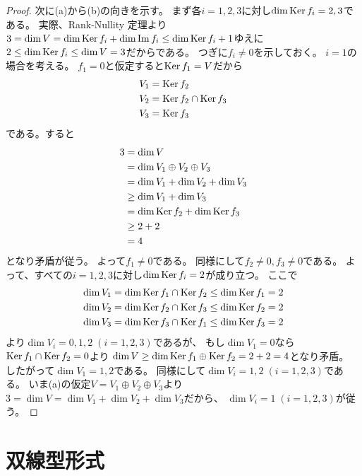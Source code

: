 \documentclass[report]{jlreq}
\begin{document}
\begin{proof}
    次に(a)から(b)の向きを示す。
    まず各$i = 1, 2, 3$に対し$\dim \operatorname{\mathrm{Ker}} f_i = 2, 3$である。
    実際、Rank-Nullity 定理より
    $3 = \dim V = \dim \operatorname{\mathrm{Ker}} f_i + \dim \operatorname{\mathrm{Im}} f_i \le \dim \operatorname{\mathrm{Ker}} f_i + 1$ゆえに
    $2 \le \dim \operatorname{\mathrm{Ker}} f_i \le \dim V = 3$だからである。
    つぎに$f_i \neq 0$を示しておく。
    $i = 1$の場合を考える。
    $f_1 = 0$と仮定すると$\operatorname{\mathrm{Ker}} f_1 = V$だから
    \begin{alignat}{1}
        V_1 &= \operatorname{\mathrm{Ker}} f_2 \\
        V_2 &= \operatorname{\mathrm{Ker}} f_2 \cap \operatorname{\mathrm{Ker}} f_3 \\
        V_3 &= \operatorname{\mathrm{Ker}} f_3
    \end{alignat}
    である。すると
    \begin{alignat}{1}
        3
            &= \dim V \\
            &= \dim V_1 \oplus V_2 \oplus V_3 \\
            &= \dim V_1 + \dim V_2 + \dim V_3 \\
            &\ge \dim V_1 + \dim V_3 \\
            &= \dim \operatorname{\mathrm{Ker}} f_2 + \dim \operatorname{\mathrm{Ker}} f_3 \\
            &\ge 2 + 2 \\
            &= 4
    \end{alignat}
    となり矛盾が従う。
    よって$f_1 \neq 0$である。
    同様にして$f_2 \neq 0, f_3 \neq 0$である。
    よって、すべての$i = 1, 2, 3$に対し$\dim \operatorname{\mathrm{Ker}} f_i = 2$が成り立つ。
    ここで
    \begin{alignat}{1}
        \dim V_1 &= \dim \operatorname{\mathrm{Ker}} f_1 \cap \operatorname{\mathrm{Ker}} f_2 \le \dim \operatorname{\mathrm{Ker}} f_1 = 2 \\
        \dim V_2 &= \dim \operatorname{\mathrm{Ker}} f_2 \cap \operatorname{\mathrm{Ker}} f_3 \le \dim \operatorname{\mathrm{Ker}} f_2 = 2 \\
        \dim V_3 &= \dim \operatorname{\mathrm{Ker}} f_3 \cap \operatorname{\mathrm{Ker}} f_1 \le \dim \operatorname{\mathrm{Ker}} f_3 = 2
    \end{alignat}
    より$\dim V_i = 0, 1, 2 \; (i = 1, 2, 3)$であるが、
    もし$\dim V_1 = 0$なら
    $\operatorname{\mathrm{Ker}} f_1 \cap \operatorname{\mathrm{Ker}} f_2 = 0$より
    $\dim V \ge \dim \operatorname{\mathrm{Ker}} f_1 \oplus \operatorname{\mathrm{Ker}} f_2 = 2 + 2 = 4$となり矛盾。
    したがって$\dim V_1 = 1, 2$である。
    同様にして$\dim V_i = 1, 2 \; (i = 1, 2, 3)$である。
    いま(a)の仮定$V = V_1 \oplus V_2 \oplus V_3$より
    $3 = \dim V = \dim V_1 + \dim V_2 + \dim V_3$だから、
    $\dim V_i = 1 \; (i = 1, 2, 3)$が従う。
    \TODO{}
\end{proof}


%
\chapter{双線型形式}
\end{document}
